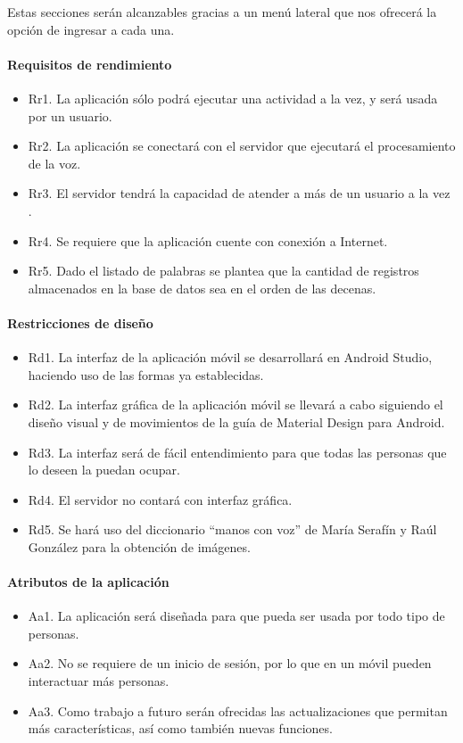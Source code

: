 Estas secciones serán alcanzables gracias a un menú lateral que nos ofrecerá la opción de ingresar a cada una.

\paragraph{Requisitos de rendimiento}
\begin{itemize}
\item	Rr1. La aplicación sólo podrá ejecutar una actividad a la vez, y será usada por un usuario.
\item	Rr2. La aplicación se conectará con el servidor que ejecutará el procesamiento de la voz.
\item	Rr3. El servidor tendrá la capacidad de atender a más de un usuario a la vez .
\item	Rr4. Se requiere que la aplicación cuente con conexión a Internet.
\item	Rr5. Dado el listado de palabras se plantea que la cantidad de registros almacenados en la base de datos sea en el orden de las decenas.
\end{itemize}

\paragraph{Restricciones de diseño}
\begin{itemize}
\item	Rd1. La interfaz de la aplicación móvil se desarrollará en Android Studio, haciendo uso de las formas ya establecidas.
\item	Rd2. La interfaz gráfica de la aplicación móvil se llevará a cabo siguiendo el diseño visual y de movimientos de la guía de Material Design para Android.
\item	Rd3. La interfaz será de fácil entendimiento para que todas las personas que lo deseen la puedan ocupar.
\item	Rd4. El servidor no contará con interfaz gráfica.
\item	Rd5. Se hará uso del diccionario “manos con voz” de María Serafín y Raúl González para la obtención de imágenes.
\end{itemize}

\paragraph{Atributos de la aplicación}
\begin{itemize}
\item	Aa1. La aplicación será diseñada para que pueda ser usada por todo tipo de personas.
\item	Aa2. No se requiere de un inicio de sesión, por lo que en un móvil pueden interactuar más personas.
\item	Aa3. Como trabajo a futuro serán ofrecidas las actualizaciones que permitan más características, así como también nuevas funciones.
\end{itemize}
